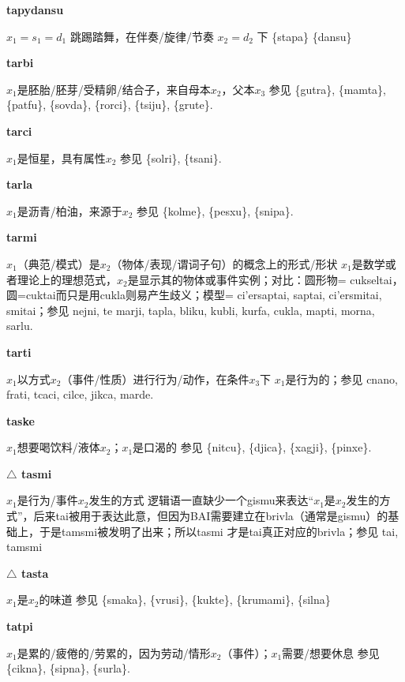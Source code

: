 \documentclass[notitlepage,twocolumn,a4paper,10pt]{book}
\begin{document}
{\sffamily\bfseries tapydansu} $x_1=s_1=d_1$ 跳踢踏舞，在伴奏\slash{}旋律\slash{}节奏 $x_2=d_2$ 下 \textemdash{} \{stapa\} \{dansu\}

{\sffamily\bfseries tarbi} $x_1$是胚胎\slash{}胚芽\slash{}受精卵\slash{}结合子，来自母本$x_2$，父本$x_3$ \textemdash{} 参见 \{gutra\}, \{mamta\}, \{patfu\}, \{sovda\}, \{rorci\}, \{tsiju\}, \{grute\}.

{\sffamily\bfseries tarci}\enspace {\ttfamily\bfseries[tar]}  $x_1$是恒星，具有属性$x_2$ \textemdash{} 参见 \{solri\}, \{tsani\}.

{\sffamily\bfseries tarla} $x_1$是沥青\slash{}柏油，来源于$x_2$ \textemdash{} 参见 \{kolme\}, \{pesxu\}, \{snipa\}.

{\sffamily\bfseries tarmi}  $x_1$（典范\slash{}模式）是$x_2$（物体\slash{}表现\slash{}谓词子句）的概念上的形式\slash{}形状 \textemdash{} $x_1$是数学或者理论上的理想范式，$x_2$是显示其的物体或事件实例；对比：圆形物= {cukseltai}，圆={cuktai}而只是用cukla则易产生歧义；模型= {ci'ersaptai}, {saptai}, {ci'ersmitai}, {smitai}；参见 {nejni}, te {marji}, {tapla}, {bliku}, {kubli}, {kurfa}, {cukla}, {mapti}, {morna}, {sarlu}.

{\sffamily\bfseries tarti}\enspace {\ttfamily\bfseries[    tra]}  $x_1$以方式$x_2$（事件\slash{}性质）进行行为\slash{}动作，在条件$x_3$下 \textemdash{} $x_1$是行为的；参见 {cnano}, {frati}, {tcaci}, {cilce}, {jikca}, {marde}.

{\sffamily\bfseries taske} $x_1$想要喝饮料\slash{}液体$x_2$；$x_1$是口渴的 \textemdash{} 参见 \{nitcu\}, \{djica\}, \{xagji\}, \{pinxe\}.

{\sffamily\bfseries $\triangle$ tasmi} $x_1$是行为\slash{}事件$x_2$发生的方式 \textemdash{} 逻辑语一直缺少一个gismu来表达“$x_1$是$x_2$发生的方式”，后来{tai}被用于表达此意，但因为BAI需要建立在brivla（通常是gismu）的基础上，于是{tamsmi}被发明了出来；所以{tasmi} 才是{tai}真正对应的brivla；参见 {tai}, {tamsmi}

{\sffamily\bfseries $\triangle$ tasta} $x_1$是$x_2$的味道 \textemdash{} 参见 \{smaka\}, \{vrusi\}, \{kukte\}, \{krumami\}, \{silna\}

{\sffamily\bfseries tatpi}\enspace {\ttfamily\bfseries[        ta'i]}  $x_1$是累的\slash{}疲倦的\slash{}劳累的，因为劳动\slash{}情形$x_2$（事件）；$x_1$需要\slash{}想要休息 \textemdash{} 参见 \{cikna\}, \{sipna\}, \{surla\}.
\end{document}
